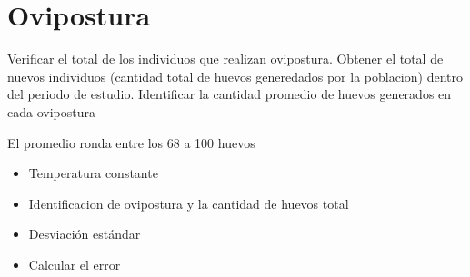 \section{Ovipostura}
Verificar el total de los individuos que realizan ovipostura. Obtener el total de
nuevos individuos (cantidad total de huevos generedados por la poblacion) dentro 
del periodo de estudio. Identificar la cantidad promedio de huevos generados en cada ovipostura

El promedio ronda entre los 68 a 100 huevos

\begin{itemize}
    \item Temperatura constante 
    \item Identificacion de ovipostura y la cantidad de huevos total
    \item Desviación estándar
    \item Calcular el error
\end{itemize}
